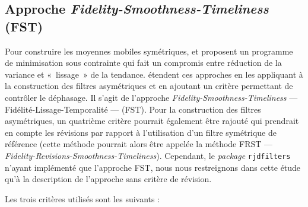 \documentclass[
  12pt,
  a4paper,french]{article}
\newcommand\1{\mathds{1}}
\begin{document}
\hypertarget{subsec-GuggemosEtAl}{%
\subsection{\texorpdfstring{Approche \emph{Fidelity-Smoothness-Timeliness} (FST)}{Approche Fidelity-Smoothness-Timeliness (FST)}}\label{subsec-GuggemosEtAl}}

Pour construire les moyennes mobiles symétriques, \textcite{GrunRehommeLadiray1994} et \textcite{GrayThomson1996} proposent un programme de minimisation sous contrainte qui fait un compromis entre réduction de la variance et «~lissage~» de la tendance.
\textcite{ch15HBSA} étendent ces approches en les appliquant à la construction des filtres asymétriques et en ajoutant un critère permettant de contrôler le déphasage.
Il s'agit de l'approche \emph{Fidelity-Smoothness-Timeliness} --- Fidélité-Lissage-Temporalité --- (FST).
Pour la construction des filtres asymétriques, un quatrième critère pourrait également être rajouté qui prendrait en compte les révisions par rapport à l'utilisation d'un filtre symétrique de référence (cette méthode pourrait alors être appelée la méthode FRST --- \emph{Fidelity-Revisions-Smoothness-Timeliness}).
Cependant, le \emph{package} \texttt{rjdfilters} n'ayant implémenté que l'approche FST, nous nous restreignons dans cette étude qu'à la description de l'approche sans critère de révision.

Les trois critères utilisés sont les suivants :
\end{document}
